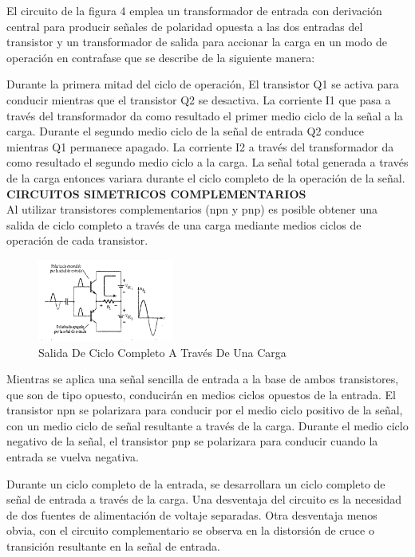 \documentclass[10pt,a4paper]{article}
\begin{document}
El circuito de la figura 4 emplea un transformador de entrada con derivación central para producir señales de polaridad opuesta a las dos entradas del transistor y un transformador de salida para accionar la carga en un modo de operación en contrafase que se describe de la siguiente manera:

Durante la primera mitad del ciclo de operación, El transistor Q1 se activa para conducir mientras que el transistor Q2 se desactiva. La corriente I1 que pasa a través del transformador da como resultado el primer medio ciclo de la señal a la carga. Durante el segundo medio ciclo de la señal de entrada Q2 conduce mientras Q1 permanece apagado. La corriente I2 a través del transformador da como resultado el segundo medio ciclo a la carga. La señal total generada a través de la carga entonces variara durante el ciclo completo de la operación de la señal.\\
\textbf{CIRCUITOS SIMETRICOS COMPLEMENTARIOS}\\
Al utilizar transistores complementarios (npn y pnp) es posible obtener una salida de ciclo completo a través de una carga mediante medios ciclos de operación de cada transistor.\\
\begin{center}
\begin{figure}[hbtp]
\centering
\includegraphics[scale=0.5]{22.png}
\caption{Salida De Ciclo Completo A Través De Una Carga}
\end{figure}
\end{center}

Mientras se aplica una señal sencilla de entrada a la base de ambos transistores, que son de tipo opuesto, conducirán en medios ciclos opuestos de la entrada. El transistor npn se polarizara para conducir por el medio ciclo positivo de la señal, con un medio ciclo de señal resultante a través de la carga. Durante el medio ciclo negativo de la señal, el transistor pnp se polarizara para conducir cuando la entrada se vuelva negativa.

Durante un ciclo completo de la entrada, se desarrollara un ciclo completo de señal de entrada a través de la carga. Una desventaja del circuito es la necesidad de dos fuentes de alimentación de voltaje separadas. Otra desventaja menos obvia, con el circuito complementario se observa en la distorsión de cruce o transición resultante en la señal de entrada.
\end{document}
